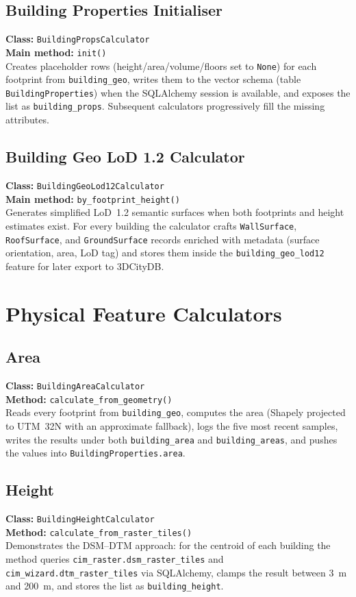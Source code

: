 \subsection{Building Properties Initialiser}
\textbf{Class:} \texttt{BuildingPropsCalculator}\\
\textbf{Main method:} \texttt{init()}\\
Creates placeholder rows (height/area/volume/floors set to
\texttt{None}) for each footprint from \texttt{building\_geo}, writes
them to the vector schema (table \texttt{BuildingProperties}) when the
SQLAlchemy session is available, and exposes the list as
\texttt{building\_props}. Subsequent calculators progressively fill the
missing attributes.

\subsection{Building Geo LoD 1.2 Calculator}
\textbf{Class:} \texttt{BuildingGeoLod12Calculator}\\
\textbf{Main method:} \texttt{by\_footprint\_height()}\\
Generates simplified LoD~1.2 semantic surfaces when both footprints and
height estimates exist. For every building the calculator crafts
\texttt{WallSurface}, \texttt{RoofSurface}, and \texttt{GroundSurface}
records enriched with metadata (surface orientation, area, LoD tag) and
stores them inside the \texttt{building\_geo\_lod12} feature for later
export to 3DCityDB.

\section{Physical Feature Calculators}
\subsection{Area}
\textbf{Class:} \texttt{BuildingAreaCalculator}\\
\textbf{Method:} \texttt{calculate\_from\_geometry()}\\
Reads every footprint from \texttt{building\_geo}, computes the area
(Shapely projected to UTM~32N with an approximate fallback), logs the
five most recent samples, writes the results under both
\texttt{building\_area} and \texttt{building\_areas}, and pushes the
values into \texttt{BuildingProperties.area}.

\subsection{Height}
\textbf{Class:} \texttt{BuildingHeightCalculator}\\
\textbf{Method:} \texttt{calculate\_from\_raster\_tiles()}\\
Demonstrates the DSM--DTM approach: for the centroid of each building
the method queries \texttt{cim\_raster.dsm\_raster\_tiles} and
\texttt{cim\_wizard.dtm\_raster\_tiles} via SQLAlchemy, clamps the
result between 3~m and 200~m, and stores the list as
\texttt{building\_height}.


